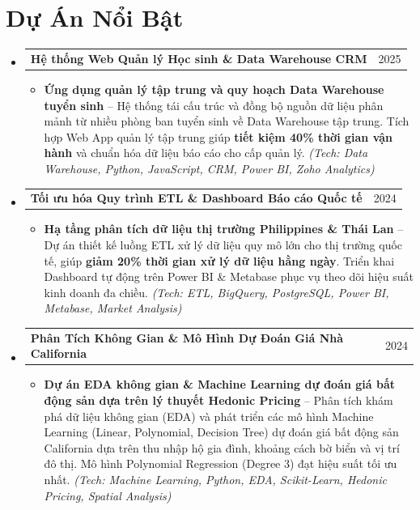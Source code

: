 \documentclass[letterpaper,11pt]{article}
\makeatletter
\newcommand{\resumeItem}[1]{
  \item\small{
    {#1 \vspace{1pt}}
  }
}
\newcommand{\resumeProjectHeading}[2]{
    \vspace{2pt}\item
    \begin{tabular*}{\textwidth}{l@{\extracolsep{\fill}}r}
      \small#1 & #2 \\
    \end{tabular*}\vspace{-2pt}
}
\newcommand{\resumeSubHeadingListStart}{\begin{itemize}[leftmargin=0.15in, label={}]}
\newcommand{\resumeSubHeadingListEnd}{\end{itemize}}
\newcommand{\resumeItemListStart}{\begin{itemize}[leftmargin=0.15in, itemsep=2.5pt, topsep=2pt, parsep=1.5pt]}
\newcommand{\resumeItemListEnd}{\end{itemize}\vspace{2pt}}
\makeatother
\begin{document}
\section*{Dự Án Nổi Bật}
  \resumeSubHeadingListStart
        \resumeProjectHeading
      {\textbf{Hệ thống Web Quản lý Học sinh \& Data Warehouse CRM}}{2025}
      \resumeItemListStart
        \resumeItem{\textbf{Ứng dụng quản lý tập trung và quy hoạch Data Warehouse tuyển sinh} -- Hệ thống tái cấu trúc và đồng bộ nguồn dữ liệu phân mảnh từ nhiều phòng ban tuyển sinh về Data Warehouse tập trung. Tích hợp Web App quản lý tập trung giúp \textbf{tiết kiệm 40\% thời gian vận hành} và chuẩn hóa dữ liệu báo cáo cho cấp quản lý. \emph{(Tech: Data Warehouse, Python, JavaScript, CRM, Power BI, Zoho Analytics)}}
      \resumeItemListEnd
    \resumeProjectHeading
      {\textbf{Tối ưu hóa Quy trình ETL \& Dashboard Báo cáo Quốc tế}}{2024}
      \resumeItemListStart
        \resumeItem{\textbf{Hạ tầng phân tích dữ liệu thị trường Philippines \& Thái Lan} -- Dự án thiết kế luồng ETL xử lý dữ liệu quy mô lớn cho thị trường quốc tế, giúp \textbf{giảm 20\% thời gian xử lý dữ liệu hằng ngày}. Triển khai Dashboard tự động trên Power BI \& Metabase phục vụ theo dõi hiệu suất kinh doanh đa chiều. \emph{(Tech: ETL, BigQuery, PostgreSQL, Power BI, Metabase, Market Analysis)}}
      \resumeItemListEnd
    \resumeProjectHeading
      {\textbf{Phân Tích Không Gian \& Mô Hình Dự Đoán Giá Nhà California}}{2024}
      \resumeItemListStart
        \resumeItem{\textbf{Dự án EDA không gian \& Machine Learning dự đoán giá bất động sản dựa trên lý thuyết Hedonic Pricing} -- Phân tích khám phá dữ liệu không gian (EDA) và phát triển các mô hình Machine Learning (Linear, Polynomial, Decision Tree) dự đoán giá bất động sản California dựa trên thu nhập hộ gia đình, khoảng cách bờ biển và vị trí đô thị. Mô hình Polynomial Regression (Degree 3) đạt hiệu suất tối ưu nhất. \emph{(Tech: Machine Learning, Python, EDA, Scikit-Learn, Hedonic Pricing, Spatial Analysis)}}
      \resumeItemListEnd
  \resumeSubHeadingListEnd

\end{document}
